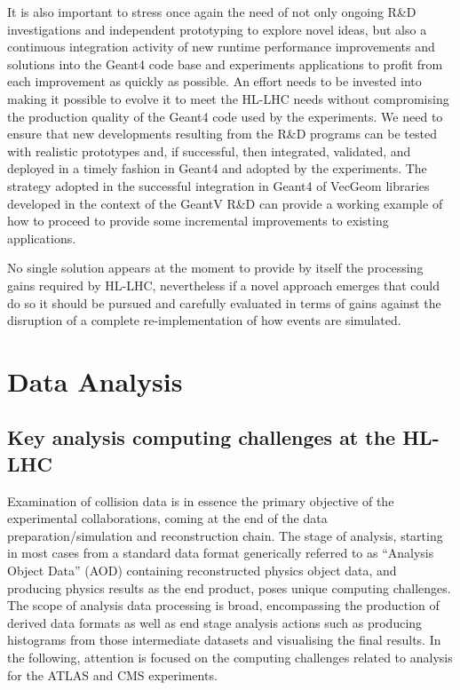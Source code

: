 \documentclass[11pt,a4paper]{article}
\begin{document}
It is also important to stress once again the need of not only ongoing
R\&D investigations and independent prototyping to explore novel ideas,
but also a continuous integration activity of new runtime performance
improvements and solutions into the Geant4 code base and experiments
applications to profit from each improvement as quickly as possible. An
effort needs to be invested into making it possible to evolve it to meet
the HL-LHC needs without compromising the production quality of the
Geant4 code used by the experiments. We need to ensure that new
developments resulting from the R\&D programs can be tested with
realistic prototypes and, if successful, then integrated, validated, and
deployed in a timely fashion in Geant4 and adopted by the experiments.
The strategy adopted in the successful integration in Geant4 of VecGeom
libraries developed in the context of the GeantV R\&D can provide a
working example of how to proceed to provide some incremental
improvements to existing applications.

No single solution appears at the moment to provide by itself the
processing gains required by HL-LHC, nevertheless if a novel approach
emerges that could do so it should be pursued and carefully evaluated in
terms of gains against the disruption of a complete re-implementation of
how events are simulated.




\hypertarget{data-analysis}{%
\section{Data Analysis}\label{data-analysis}}

\hypertarget{key-analysis-computing-challenges-at-the-hl-lhc}{%
\subsection{Key analysis computing challenges at the
HL-LHC}\label{key-analysis-computing-challenges-at-the-hl-lhc}}

Examination of collision data is in essence the primary objective of the
experimental collaborations, coming at the end of the data
preparation/simulation and reconstruction chain. The stage of analysis,
starting in most cases from a standard data format generically referred
to as ``Analysis Object Data'' (AOD) containing reconstructed physics
object data, and producing physics results as the end product, poses
unique computing challenges. The scope of analysis data processing is
broad, encompassing the production of derived data formats as well as
end stage analysis actions such as producing histograms from those
intermediate datasets and visualising the final results. In the
following, attention is focused on the computing challenges related to
analysis for the ATLAS and CMS experiments.
\end{document}
